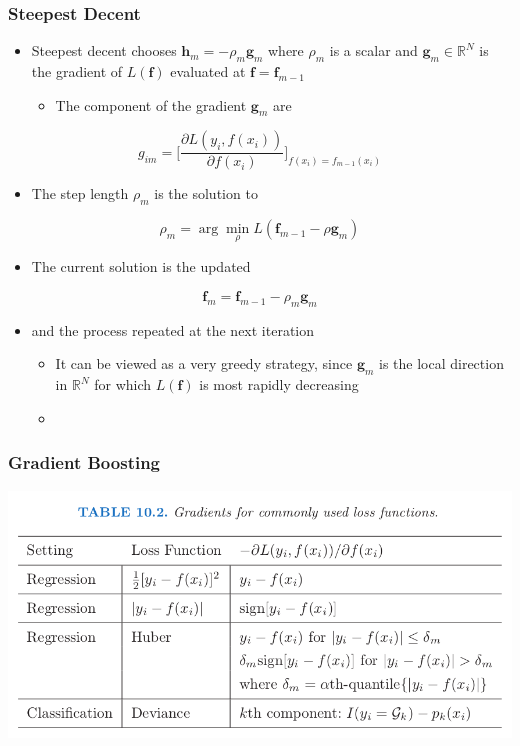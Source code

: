 \documentclass[11pt]{article}
\begin{document}
\subsubsection{Steepest Decent}
\label{sec:org4ffc177}
\begin{itemize}
\item Steepest decent chooses \(\pmb h_m = - \rho_m \pmb g_m\) where \(\rho_m\) is a scalar and \(\pmb g_m \in \mathbb R^N\) is the gradient of \(L(\pmb f)\) evaluated at \(\pmb f = \pmb f_{m-1}\)
\begin{itemize}
\item The component of the gradient \(\pmb g_m\) are
\end{itemize}
\end{itemize}
\begin{equation}
  g_{im} = \bigg[\frac{\partial L(y_i, f(x_i))}{\partial f(x_i)}\bigg]_{f(x_i)=f_{m-1}(x_i)}
\end{equation}
\begin{itemize}
\item The step length \(\rho_m\) is the solution to
\end{itemize}
\begin{equation}
  \rho_m = \arg \min_\rho L(\pmb f_{m-1}-\rho \pmb g_m)
\end{equation}
\begin{itemize}
\item The current solution is the updated
\end{itemize}
\begin{equation}
  \pmb f_m = \pmb f_{m-1}-\rho_m\pmb g_m
\end{equation}
\begin{itemize}
\item and the process repeated at the next iteration
\begin{itemize}
\item It can be viewed as a very greedy strategy, since \(\pmb g_m\) is the local direction in \(\mathbb R^N\) for which \(L(\pmb f)\) is most rapidly decreasing
\item 
\end{itemize}
\end{itemize}

\subsubsection{Gradient Boosting}
\label{sec:org0319f7d}
\begin{center}
\includegraphics[width=.9\linewidth]{Boosting and Additive Trees/screenshot_2018-10-22_21-24-34.png}
\end{center}
\end{document}
